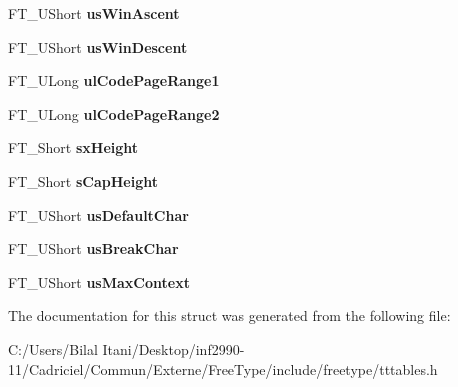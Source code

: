 \begin{DoxyCompactItemize}
\item 
F\+T\+\_\+\+U\+Short {\bfseries us\+Win\+Ascent}\hypertarget{struct_t_t___o_s2___aeb85b76e77753e4b59945550bdd098a1}{}\label{struct_t_t___o_s2___aeb85b76e77753e4b59945550bdd098a1}

\item 
F\+T\+\_\+\+U\+Short {\bfseries us\+Win\+Descent}\hypertarget{struct_t_t___o_s2___a573ace3da03efa98a716a8443e4d0084}{}\label{struct_t_t___o_s2___a573ace3da03efa98a716a8443e4d0084}

\item 
F\+T\+\_\+\+U\+Long {\bfseries ul\+Code\+Page\+Range1}\hypertarget{struct_t_t___o_s2___a0b5a2875c21d20e5a5b5f3641ddb29fc}{}\label{struct_t_t___o_s2___a0b5a2875c21d20e5a5b5f3641ddb29fc}

\item 
F\+T\+\_\+\+U\+Long {\bfseries ul\+Code\+Page\+Range2}\hypertarget{struct_t_t___o_s2___ad117c64d73d15d1304c75fb5f41f1124}{}\label{struct_t_t___o_s2___ad117c64d73d15d1304c75fb5f41f1124}

\item 
F\+T\+\_\+\+Short {\bfseries sx\+Height}\hypertarget{struct_t_t___o_s2___a2eb3bb1392461a536c393304bde72835}{}\label{struct_t_t___o_s2___a2eb3bb1392461a536c393304bde72835}

\item 
F\+T\+\_\+\+Short {\bfseries s\+Cap\+Height}\hypertarget{struct_t_t___o_s2___ac755913b648d535d1207927e4a6f1ec0}{}\label{struct_t_t___o_s2___ac755913b648d535d1207927e4a6f1ec0}

\item 
F\+T\+\_\+\+U\+Short {\bfseries us\+Default\+Char}\hypertarget{struct_t_t___o_s2___af8639fefeb705a9287df996b224462ea}{}\label{struct_t_t___o_s2___af8639fefeb705a9287df996b224462ea}

\item 
F\+T\+\_\+\+U\+Short {\bfseries us\+Break\+Char}\hypertarget{struct_t_t___o_s2___a1d47030e246d2593ec3e4cdf66b17161}{}\label{struct_t_t___o_s2___a1d47030e246d2593ec3e4cdf66b17161}

\item 
F\+T\+\_\+\+U\+Short {\bfseries us\+Max\+Context}\hypertarget{struct_t_t___o_s2___a167313e407c77db2c4ca5a987f3a1482}{}\label{struct_t_t___o_s2___a167313e407c77db2c4ca5a987f3a1482}

\end{DoxyCompactItemize}


The documentation for this struct was generated from the following file\+:\begin{DoxyCompactItemize}
\item 
C\+:/\+Users/\+Bilal Itani/\+Desktop/inf2990-\/11/\+Cadriciel/\+Commun/\+Externe/\+Free\+Type/include/freetype/tttables.\+h\end{DoxyCompactItemize}

